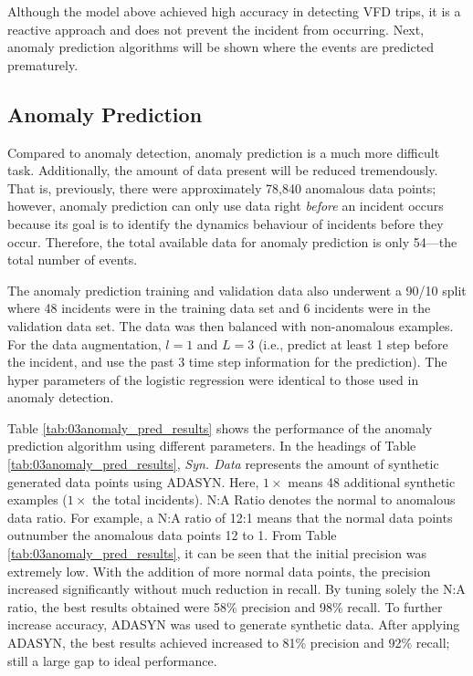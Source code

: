 Although the model above achieved high accuracy in detecting VFD trips, it is a reactive approach and does not prevent the incident from occurring.  Next, anomaly prediction algorithms will be shown where the events are predicted prematurely.  

\subsection{Anomaly Prediction}
Compared to anomaly detection, anomaly prediction is a much more difficult task.  Additionally, the amount of data present will be reduced tremendously.  That is, previously, there were approximately 78,840 anomalous data points; however, anomaly prediction can only use data right \textit{before} an incident occurs because its goal is to identify the dynamics behaviour of incidents before they occur.
Therefore, the total available data for anomaly prediction is only 54---the total number of events.

The anomaly prediction training and validation data also underwent a 90/10 split where 48 incidents were in the training data set and 6 incidents were in the validation data set. The data was then balanced with non-anomalous examples.  For the data augmentation, $l = 1$ and $L = 3$ (i.e., predict at least 1 step before the incident, and use the past 3 time step information for the prediction). The hyper parameters of the logistic regression were identical to those used in anomaly detection.

Table \ref{tab:03anomaly_pred_results} shows the performance of the anomaly prediction algorithm using different parameters.  In the headings of Table \ref{tab:03anomaly_pred_results}, \textit{Syn. Data} represents the amount of synthetic generated data points using ADASYN.  Here, $1 \times$ means 48 additional synthetic examples ($1 \times$ the total incidents).  N:A Ratio denotes the normal to anomalous data ratio.  For example, a N:A ratio of 12:1 means that the normal data points outnumber the anomalous data points 12 to 1. From Table \ref{tab:03anomaly_pred_results}, it can be seen that the initial precision was extremely low. With the addition of more normal data points, the precision increased significantly without much reduction in recall.  By tuning solely the N:A ratio, the best results obtained were 58\% precision and 98\% recall. To further increase accuracy, ADASYN was used to generate synthetic data.  After applying ADASYN, the best results achieved increased to 81\% precision and 92\% recall; still a large gap to ideal performance.  

